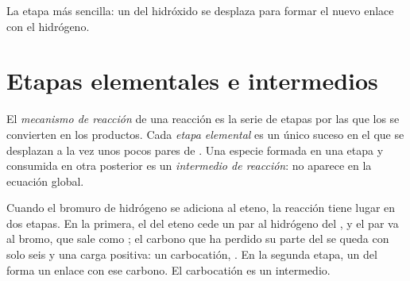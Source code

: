 \begin{omfigure}
\qquad\raisebox{0.2ex}{$+$}\qquad
{}
\qquad\raisebox{0.2ex}{$\longrightarrow$}\qquad
{}

{\small La etapa más sencilla: un  del  hidróxido se desplaza
para formar el nuevo enlace  con el  hidrógeno.}
\end{omfigure}

\section{Etapas elementales e intermedios}

\begin{definition}\label{def:g12:curly-arrows:mechanism}
El \emph{mecanismo de reacción} de una
reacción es la serie de etapas por las que los  se convierten en
los productos. Cada \emph{etapa elemental} es un
único suceso en el que se desplazan a la vez unos pocos pares de
. Una especie formada en una etapa y consumida en otra
posterior es un \emph{intermedio de reacción}:
no aparece en la ecuación global.
\end{definition}


\begin{example}\label{ex:g12:curly-arrows:carbocation}
Cuando el bromuro de hidrógeno se adiciona al eteno, la reacción tiene
lugar en dos etapas. En la primera, el  del eteno cede un par
al hidrógeno del , y el par  va al bromo, que sale como
; el carbono que ha perdido su parte del  se queda
con solo seis  y una carga positiva: un carbocatión,
. En la segunda etapa, un  del  forma un
enlace con ese carbono. El carbocatión es un intermedio.
\end{example}

